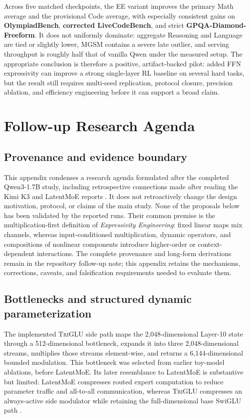 \documentclass[10pt]{article}
\newcommand{\EE}{\textit{Expressivity Engineering}}
\newcommand{\TriGLU}{\textsc{TriGLU}}
\begin{document}
Across five matched checkpoints, the EE variant improves the primary Math
average and the provisional Code average, with especially consistent gains on
\textbf{OlympiadBench}, \textbf{corrected LiveCodeBench}, and strict
\textbf{GPQA-Diamond-Freeform}.  It
does not uniformly dominate: aggregate Reasoning and Language are tied or
slightly lower, MGSM contains a severe late outlier, and serving throughput is
roughly half that of vanilla Qwen under the measured setup.  The appropriate
conclusion is therefore a positive, artifact-backed pilot: added FFN expressivity
can improve a strong single-layer RL baseline on several hard tasks, but the
result still requires multi-seed replication, protocol closure, precision
ablation, and efficiency engineering before it can support a broad claim.

\clearpage
\appendix
\section{Follow-up Research Agenda}
\label{app:followup-agenda}

\subsection{Provenance and evidence boundary}

This appendix condenses a research agenda formulated after the completed
Qwen3-1.7B study, including retrospective connections made after reading the
Kimi K3 and LatentMoE reports \citep{kimit2026k3,elango2026latentmoe}.  It does
not retroactively change the design motivation, protocol, or claims of the
main study.  None of the proposals below has been validated by the reported
runs.  Their common premise is the multiplication-first definition of \EE{}:
fixed linear maps mix channels, whereas input-conditioned multiplication,
dynamic operators, and compositions of nonlinear components introduce
higher-order or context-dependent interactions.  The complete provenance and
long-form derivations remain in the repository follow-up note; this appendix
retains the mechanisms, corrections, caveats, and falsification requirements
needed to evaluate them.

\subsection{Bottlenecks and structured dynamic parameterization}

The implemented \TriGLU{} side path maps the 2,048-dimensional Layer-10 state
through a 512-dimensional bottleneck, expands it into three 2,048-dimensional
streams, multiplies those streams element-wise, and returns a 6,144-dimensional
bounded modulation.  This bottleneck was selected from earlier toy-model
ablations, before LatentMoE.  Its later resemblance to LatentMoE is substantive
but limited: LatentMoE compresses routed expert computation to reduce parameter
traffic and all-to-all communication, whereas \TriGLU{} compresses an
always-active side modulator while retaining the full-dimensional base SwiGLU
path \citep{elango2026latentmoe}.
\end{document}
